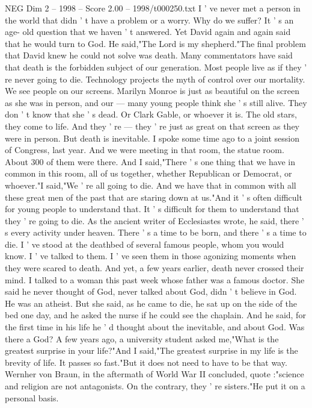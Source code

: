 \begin{textsample}{NEG Dim 2 – 1998 – Score 2.00 – 1998/t000250.txt}
I ' ve never met a person in the world that didn ' t have a problem or a worry.
Why do we suffer?
It ' s an age- old question that we haven ' t answered.
Yet David again and again said that he would turn to God.
He said,"The Lord is my shepherd."The final problem that David knew he could not solve was death.
Many commentators have said that death is the forbidden subject of our generation.
Most people live as if they ' re never going to die.
Technology projects the myth of control over our mortality.
We see people on our screens.
Marilyn Monroe is just as beautiful on the screen as she was in person, and our — many young people think she ' s still alive.
They don ' t know that she ' s dead.
Or Clark Gable, or whoever it is.
The old stars, they come to life.
And they ' re — they ' re just as great on that screen as they were in person.
But death is inevitable.
I spoke some time ago to a joint session of Congress, last year.
And we were meeting in that room, the statue room.
About 300 of them were there.
And I said,"There ' s one thing that we have in common in this room, all of us together, whether Republican or Democrat, or whoever."I said,"We ' re all going to die.
And we have that in common with all these great men of the past that are staring down at us."And it ' s often difficult for young people to understand that.
It ' s difficult for them to understand that they ' re going to die.
As the ancient writer of Ecclesiastes wrote, he said, there ' s every activity under heaven.
There ' s a time to be born, and there ' s a time to die.
I ' ve stood at the deathbed of several famous people, whom you would know.
I ' ve talked to them.
I ' ve seen them in those agonizing moments when they were scared to death.
And yet, a few years earlier, death never crossed their mind.
I talked to a woman this past week whose father was a famous doctor.
She said he never thought of God, never talked about God, didn ' t believe in God.
He was an atheist.
But she said, as he came to die, he sat up on the side of the bed one day, and he asked the nurse if he could see the chaplain.
And he said, for the first time in his life he ' d thought about the inevitable, and about God.
Was there a God?
A few years ago, a university student asked me,"What is the greatest surprise in your life?"And I said,"The greatest surprise in my life is the brevity of life.
It passes so fast."But it does not need to have to be that way.
Wernher von Braun, in the aftermath of World War II concluded, quote :"science and religion are not antagonists.
On the contrary, they ' re sisters."He put it on a personal basis.

\end{textsample}
